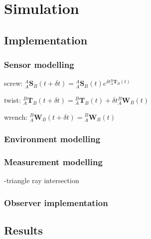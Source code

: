 \chapter{Simulation}
\section{Implementation}
\subsection{Sensor modelling}
screw: ${^{A}_{A}\mathbf{S}^{}_{B}}(t+\delta t) = {^{A}_{A}\mathbf{S}^{}_{B}(t)}e^{\delta t {^{B}_{A}\mathbf{T}^{}_{B}(t)}}$
			
twist: ${^{B}_{A}\mathbf{T}^{}_{B}}(t+\delta t) = {^{B}_{A}\mathbf{T}^{}_{B}(t)} + \delta t {^{B}_{A}\mathbf{W}^{}_{B}(t)}$

wrench: ${^{B}_{A}\mathbf{W}^{}_{B}}(t+\delta t) = {^{B}_{A}\mathbf{W}^{}_{B}(t)}$

\subsection{Environment modelling}
\subsection{Measurement modelling}
-triangle ray intersection
\subsection{Observer implementation}
\section{Results}